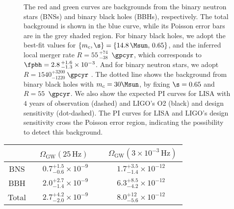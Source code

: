 \begin{figure}[htbp!]
{    The red and green curves are backgrounds from the binary neutron stars (BNSs) and binary black holes (BBHs), respectively. 
    The total background is shown in the blue curve, while
    its Poisson error bars are in the grey shaded region.
    For binary black holes, we adopt the best-fit values for 
    $\{m_c, \s\} = \{14.8\, \Msun,\,0.65\}$, 
    and the inferred local merger rate $R = 55\,^{+74}_{-38}$\, $\gpcyr$,
    which corresponds to $\fpbh = 2.8\,^{+1.6}_{-1.3} \times 10^{-3}$.
    And for binary neutron stars, we adopt $R = 1540_{-1220}^{+3200}$\,$\gpcyr$ 
    \citep{TheLIGOScientific:2017qsa}.
    The dotted line shows the background from binary black holes with $m_c = 30 \Msun$, 
    by fixing $\s = 0.65$ and $R = 55$\, $\gpcyr$.
    We also show the expected PI curves for LISA with $4$ years of 
    observation (dashed) and
    LIGO's O2 (black) and design sensitivity (dot-dashed).
    The PI curves for LISA and LIGO's design sensitivity cross the Poisson
    error region, indicating the possibility to detect this background.}
\end{figure}

\begin{table}[htb!]
    \centering
    \begin{tabular}{c|c|c}
        &\ $\Omega_{\mathrm{GW}}(25 \, \mathrm{Hz})$ \
        &\ $\Omega_{\mathrm{GW}}(3 \times 10^{-3} \, \mathrm{Hz})$\,\\
        \hline
        BNS\, &  $0.7^{+1.5}_{-0.6} \times 10^{-9}$ 
        & $1.7^{+3.5}_{-1.4} \times 10^{-12}$ \\
        [.3em]
        \hline
        BBH\, & $2.0^{+2.7}_{-1.4} \times 10^{-9}$  
        & $6.3^{+8.5}_{-4.2} \times 10^{-12}$ \\
        [.3em]
        \hline
        Total\, & $2.7^{+4.2}_{-2.0} \times 10^{-9}$  
        & $8.0^{+12}_{-5.6} \times 10^{-12}$ \\
        [.2em]
    \end{tabular}
\end{table}

